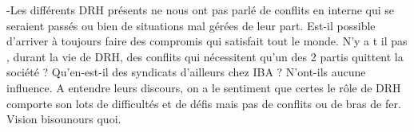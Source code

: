  
 
-Les différents DRH présents ne nous ont pas parlé de conflits en interne qui se seraient passés ou bien de situations mal gérées de leur part. Est-il possible d'arriver à toujours faire des compromis qui satisfait tout le monde. N'y a t il pas , durant la vie de DRH, des conflits qui nécessitent qu'un des 2 partis quittent la société ? Qu'en-est-il des syndicats d'ailleurs chez IBA ? N'ont-ils aucune influence. A entendre leurs discours, on a le sentiment que certes le rôle de DRH comporte son lots de difficultés et de défis mais pas de conflits ou de bras de fer. Vision bisounours quoi.
